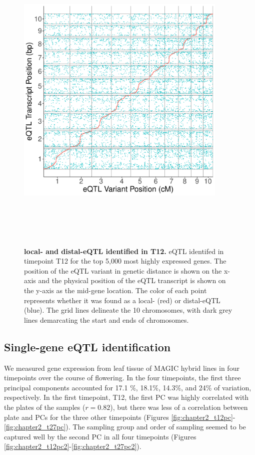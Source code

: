 \documentclass[article,9pt,twocolumn,twoside]{rilabRxiv}
\begin{document}
\begin{figure}[ht!]
\centering
\includegraphics[width=0.9\textwidth,height=6in]{figures/WD_0712_top5k_cis_trans.pdf}
\caption{\textbf{local- and distal-eQTL identified in T12.} eQTL identifed in timepoint T12 for the top 5,000 most highly expressed genes. The position of the eQTL variant in genetic distance is shown on the x-axis and the physical position of the eQTL transcript is shown on the y-axis as the mid-gene location. The color of each point represents whether it was found as a local- (red) or distal-eQTL (blue). The grid lines delineate the 10 chromosomes, with dark grey lines demarcating the start and ends of chromosomes.}
\label{fig:cistransfigure}
\end{figure}

\subsection{Single-gene eQTL identification}
We measured gene expression from leaf tissue of MAGIC hybrid lines in four timepoints over the course of flowering.
In the four timepoints, the first three principal components accounted for 17.1 \%, 18.1\%, 14.3\%, and  24\% of variation, respectively.
In the first timepoint, T12, the first PC was highly correlated with the plates of the samples ($r=0.82$), but there was less of a correlation between plate and PCs for the three other timepoints (Figures \ref{fig:chapter2_t12pc}-\ref{fig:chapter2_t27pc}).
The sampling group and order of sampling seemed to be captured well by the second PC in all four timepoints (Figures \ref{fig:chapter2_t12pc2}-\ref{fig:chapter2_t27pc2}).
\end{document}

